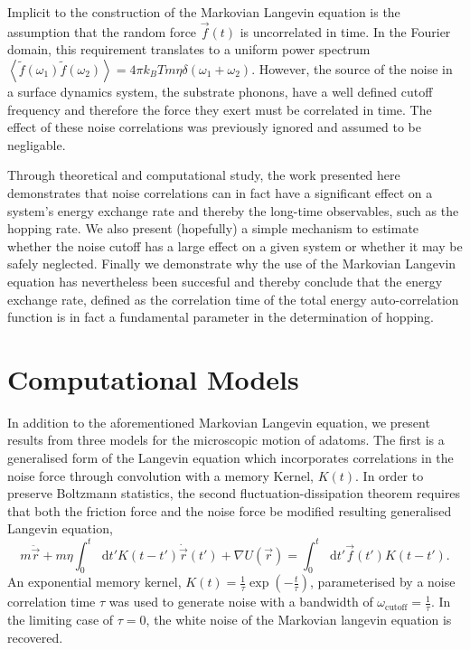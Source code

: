 \documentclass[7pt]{article}
\newcommand*{\diff}{\mathop{}\!\mathrm{d}}
\begin{document}
Implicit to the construction of the Markovian Langevin equation is the assumption that the random force $\vec{f}(t)$ is uncorrelated in time. In the Fourier domain, this requirement translates to a uniform power spectrum $\left<\tilde{f}(\omega_1)\tilde{f}(\omega_2)\right>=4\pi k_BTm\eta\delta(\omega_1+\omega_2)$. However, the source of the noise in a surface dynamics system, the substrate phonons, have a well defined cutoff frequency and therefore the force they exert must be correlated in time. The effect of these noise correlations was previously ignored and assumed to be negligable. 

Through theoretical and computational study, the work presented here demonstrates that noise correlations can in fact have a significant effect on a system's energy exchange rate and thereby the long-time observables, such as the hopping rate. We also present (hopefully) a simple mechanism to estimate whether the noise cutoff has a large effect on a given system or whether it may be safely neglected. Finally we demonstrate why the use of the Markovian Langevin equation has nevertheless been succesful and thereby conclude that the energy exchange rate, defined as the correlation time of the total energy auto-correlation function is in fact a fundamental parameter in the determination of hopping. 

\section*{Computational Models}

In addition to the aforementioned Markovian Langevin equation, we present results from three models for the microscopic motion of adatoms. The first is a generalised form of the Langevin equation which incorporates correlations in the noise force through convolution with a memory Kernel, $K(t)$. In order to preserve Boltzmann statistics, the second fluctuation-dissipation theorem requires that both the friction force and the noise force be modified resulting generalised Langevin equation\cite{Kubo},
\begin{equation}
	m\ddot{\vec{r}}+m\eta\int_0^t\diff{t'}K(t-t')\dot{\vec{r}}(t')+\nabla U(\vec{r})=\int_0^t\diff{t'}\vec{f}(t')K(t-t').
	\label{eq:gle}
\end{equation}
An exponential memory kernel, $K(t)=\frac{1}{\tau}\exp\left(-\frac{t}{\tau}\right)$, parameterised by a noise correlation time $\tau$ was used to generate noise with a bandwidth of $\omega_\text{cutoff}=\frac{1}{\tau}$. In the limiting case of $\tau=0$, the white noise of the Markovian langevin equation is recovered. 
\end{document}
